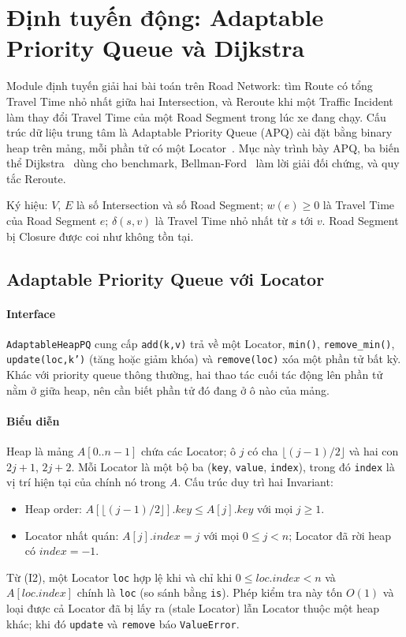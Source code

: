 \section{Định tuyến động: Adaptable Priority Queue và Dijkstra}
\label{sec:routing}

Module định tuyến giải hai bài toán trên Road Network: tìm Route có tổng Travel Time nhỏ nhất giữa hai Intersection, và Reroute khi một Traffic Incident làm thay đổi Travel Time của một Road Segment trong lúc xe đang chạy. Cấu trúc dữ liệu trung tâm là Adaptable Priority Queue (APQ) cài đặt bằng binary heap trên mảng, mỗi phần tử có một Locator~\cite{goodrich2013}. Mục này trình bày APQ, ba biến thể Dijkstra~\cite{dijkstra1959} dùng cho benchmark, Bellman-Ford~\cite{bellman1958} làm lời giải đối chứng, và quy tắc Reroute.

Ký hiệu: $V$, $E$ là số Intersection và số Road Segment; $w(e) \ge 0$ là Travel Time của Road Segment $e$; $\delta(s,v)$ là Travel Time nhỏ nhất từ $s$ tới $v$. Road Segment bị Closure được coi như không tồn tại.

\subsection{Adaptable Priority Queue với Locator}

\paragraph{Interface}
\texttt{AdaptableHeapPQ} cung cấp \texttt{add(k,v)} trả về một Locator, \texttt{min()}, \texttt{remove\_min()}, \texttt{update(loc,k')} (tăng hoặc giảm khóa) và \texttt{remove(loc)} xóa một phần tử bất kỳ. Khác với priority queue thông thường, hai thao tác cuối tác động lên phần tử nằm ở giữa heap, nên cần biết phần tử đó đang ở ô nào của mảng.

\paragraph{Biểu diễn}
Heap là mảng $A[0..n-1]$ chứa các Locator; ô $j$ có cha $\lfloor (j-1)/2 \rfloor$ và hai con $2j+1$, $2j+2$. Mỗi Locator là một bộ ba (\texttt{key}, \texttt{value}, \texttt{index}), trong đó \texttt{index} là vị trí hiện tại của chính nó trong $A$. Cấu trúc duy trì hai Invariant:
\begin{itemize}
  \item[(I1)] Heap order: $A[\lfloor (j-1)/2 \rfloor].\mathit{key} \le A[j].\mathit{key}$ với mọi $j \ge 1$.
  \item[(I2)] Locator nhất quán: $A[j].\mathit{index} = j$ với mọi $0 \le j < n$; Locator đã rời heap có $\mathit{index} = -1$.
\end{itemize}
Từ (I2), một Locator \texttt{loc} hợp lệ khi và chỉ khi $0 \le \mathit{loc.index} < n$ và $A[\mathit{loc.index}]$ chính là \texttt{loc} (so sánh bằng \texttt{is}). Phép kiểm tra này tốn $O(1)$ và loại được cả Locator đã bị lấy ra (stale Locator) lẫn Locator thuộc một heap khác; khi đó \texttt{update} và \texttt{remove} báo \texttt{ValueError}.


